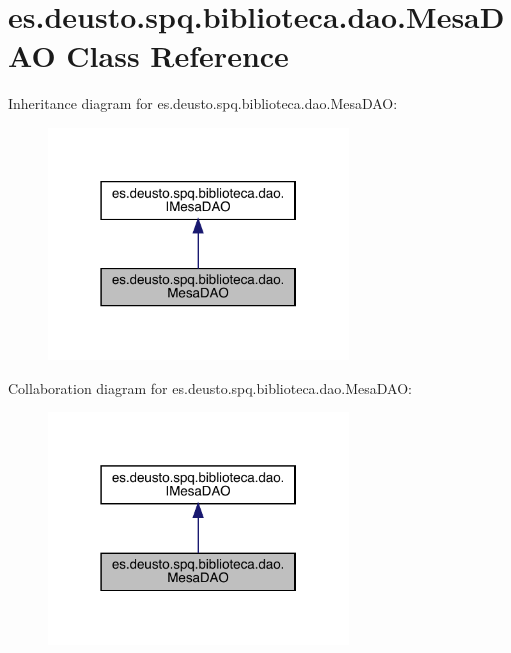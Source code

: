 \hypertarget{classes_1_1deusto_1_1spq_1_1biblioteca_1_1dao_1_1_mesa_d_a_o}{}\section{es.\+deusto.\+spq.\+biblioteca.\+dao.\+Mesa\+D\+AO Class Reference}
\label{classes_1_1deusto_1_1spq_1_1biblioteca_1_1dao_1_1_mesa_d_a_o}


Inheritance diagram for es.\+deusto.\+spq.\+biblioteca.\+dao.\+Mesa\+D\+AO\+:
\nopagebreak
\begin{figure}[H]
\begin{center}
\leavevmode
\includegraphics[width=226pt]{classes_1_1deusto_1_1spq_1_1biblioteca_1_1dao_1_1_mesa_d_a_o__inherit__graph}
\end{center}
\end{figure}


Collaboration diagram for es.\+deusto.\+spq.\+biblioteca.\+dao.\+Mesa\+D\+AO\+:
\nopagebreak
\begin{figure}[H]
\begin{center}
\leavevmode
\includegraphics[width=226pt]{classes_1_1deusto_1_1spq_1_1biblioteca_1_1dao_1_1_mesa_d_a_o__coll__graph}
\end{center}
\end{figure}
